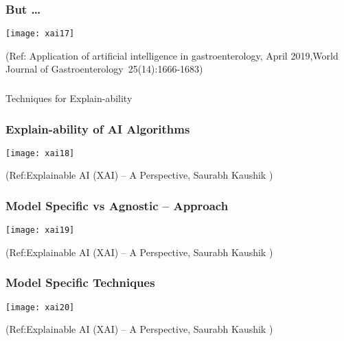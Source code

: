 \begin{frame}[fragile]\frametitle{But \ldots}
\begin{center}
\texttt{[image: xai17]}
\end{center}

\tiny{(Ref: Application of artificial intelligence in gastroenterology, April 2019,World Journal of Gastroenterology 25(14):1666-1683)
}
\end{frame}


\begin{frame}[fragile]\frametitle{}
\begin{center}
{\Large Techniques for Explain-ability}
\end{center}
\end{frame}

\begin{frame}[fragile]\frametitle{Explain-ability of AI Algorithms}
\begin{center}
\texttt{[image: xai18]}
\end{center}

\tiny{(Ref:Explainable AI (XAI) – A Perspective, Saurabh Kaushik  )}


\end{frame}

\begin{frame}[fragile]\frametitle{Model Specific vs Agnostic – Approach}
\begin{center}
\texttt{[image: xai19]}
\end{center}

\tiny{(Ref:Explainable AI (XAI) – A Perspective, Saurabh Kaushik  )}
\end{frame}

\begin{frame}[fragile]\frametitle{ Model Specific Techniques}
\begin{center}
\texttt{[image: xai20]}
\end{center}

\tiny{(Ref:Explainable AI (XAI) – A Perspective, Saurabh Kaushik  )}
\end{frame}

